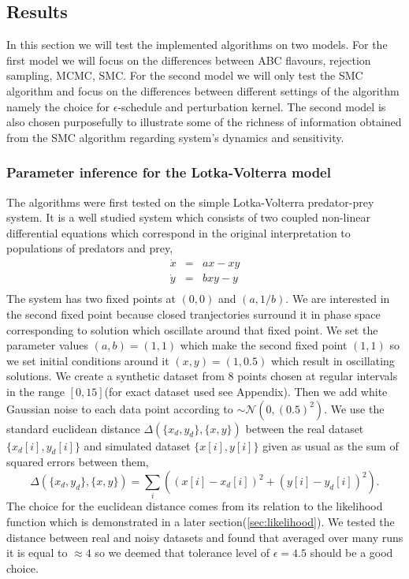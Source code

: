 \documentclass[12pt,a4paper,titlepage]{article}
\begin{document}
\subsection{Results}
In this section we will test the implemented algorithms on two models. For the first model we will focus on the differences between ABC flavours, rejection sampling, MCMC, SMC. For the second model we will only test the SMC algorithm and focus on the differences between different settings of the algorithm namely the choice for $\epsilon$-schedule and perturbation kernel. The second model is also chosen purposefully to illustrate some of the richness of information obtained from the SMC algorithm regarding system's dynamics and sensitivity.

\subsubsection{Parameter inference for the Lotka-Volterra model}
The algorithms were first tested on the simple Lotka-Volterra predator-prey system\cite{lotka1925elements}. It is a well studied system which consists of two coupled non-linear differential equations which correspond in the original interpretation to populations of predators and prey, 
\begin{equation}
\begin{array}{lcl}
\dot x &=& ax - xy \\
\dot y &=& bxy - y \\
\end{array}
\end{equation}
The system has two fixed points at $(0, 0)$ and $(a, 1/b)$. We are interested in the second fixed point because closed tranjectories surround it in phase space corresponding to solution which oscillate around that fixed point. We set the parameter values $(a,b) = (1,1)$ which make the second fixed point $(1, 1)$ so we set initial conditions around it $(x,y) = (1, 0.5)$ which result in oscillating solutions. We create a synthetic dataset from 8 points chosen at regular intervals in the range $[0, 15]$(for exact dataset used see Appendix). Then we add white Gaussian noise to each data point according to $\sim \mathcal{N}(0,(0.5)^2)$. We use the standard euclidean distance $\Delta(\{x_d, y_d\}, \{x, y\})$ between the real dataset $\{x_d[i], y_d[i]\}$ and simulated dataset $\{x[i], y[i]\}$ given as usual as the sum of squared errors between them,
\begin{equation}
\Delta(\{x_d, y_d\}, \{x, y\}) = \sum_{i}\left((x[i] - x_d[i] )^2 + (y[i]-y_d[i])^2\right).
\end{equation}
The choice for the euclidean distance comes from its relation to the likelihood function which is demonstrated in a later section(\ref{sec:likelihood}). We tested the distance between real and noisy datasets and found that averaged over many runs it is equal to $\approx 4$ so we deemed that tolerance level of $\epsilon=4.5$ should be a good choice. 
\end{document}
